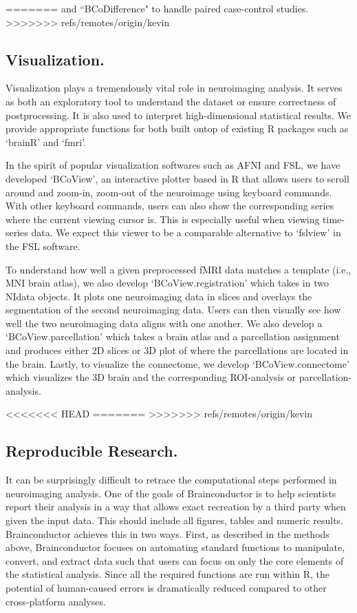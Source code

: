 \documentclass{nature}
\begin{document}
=======
and ``BCoDifference" to handle paired case-control studies.
>>>>>>> refs/remotes/origin/kevin

\subsection{Visualization.}
Visualization plays a tremendously vital role in neuroimaging analysis.
It serves as both an exploratory tool to understand the dataset or ensure
correctness
of postprocessing. It is also used to interpret high-dimensional statistical
results.
We provide appropriate functions for both built ontop of existing R packages
such
as `brainR' and `fmri'.

In the spirit of popular visualization softwares such as AFNI and FSL, we have
developed `BCoView', an interactive plotter based in R that allows users to
scroll around and
zoom-in, zoom-out of the neuroimage using keyboard commands. With other keyboard
commands, users can also show the corresponding series where the current
viewing
cursor is. This is especially useful when viewing time-series data. 
We expect this viewer to be a comparable alternative to `fslview' in
the FSL
software.

To understand how well a given preprocessed fMRI data matches a template (i.e.,
MNI brain
atlas), we also develop `BCoView.registration' which takes in two NIdata
objects.
It plots one neuroimaging data in slices and overlays the segmentation of the
second
neuroimaging data. Users can then visually see how well the two neuroimaging
data aligns
with one another. We also develop a `BCoView.parcellation' which takes a brain
atlas and
a parcellation assignment and produces either 2D slices or 3D plot of where the
parcellations
are located in the brain.
Lastly, to visualize the connectome, we develop `BCoView.connectome' which
visualizes the
3D brain and the corresponding ROI-analysis or parcellation-analysis.

<<<<<<< HEAD
=======
>>>>>>> refs/remotes/origin/kevin

\subsection{Reproducible Research.}

It can be surprisingly difficult to retrace the computational steps performed
in neuroimaging analysis. One of the goals of Brainconductor is to help
scientists report their analysis in a way that allows exact recreation by
a third party when given the input data. This should include all figures,
tables and numeric results. Brainconductor achieves this in two ways.
First, as described in the methods above, Brainconductor focuses on automating
standard functions to manipulate, convert, and extract data such that users
can focus on only the core elements of the statistical analysis. Since all the
required functions are run within R, the potential of human-caused errors is
dramatically reduced compared to other cross-platform analyses.
\end{document}
